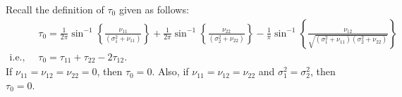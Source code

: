 \documentclass[twoside]{article}
\newcommand{\bZ}{\mathbf{Z}}
\newcommand{\bF}{\mathbf{F}}
\newcommand{\0}{\mathbf{0}}
\newcommand{\1}{\mathbf{1}}
\numberwithin{equation}{section}
\newtheorem{cor}[thm]{Corollary}
\begin{document}
Recall the definition of $\tau_0$ given as follows:
\begin{align*}
 &\ \tau_0 = \frac{1}{2\pi}\sin^{-1}\left \{\frac{\nu_{11}}{(\sigma^2_1 + \nu_{11})}\right\}+ \frac{1}{2\pi}\sin^{-1}\left \{\frac{\nu_{22}}{(\sigma^2_2 + \nu_{22})}\right\}- \frac{1}{\pi}\sin^{-1}\left \{\frac{\nu_{12}}{\sqrt{(\sigma^2_1 + \nu_{11})(\sigma^2_2 + \nu_{22})}}\right\}\\
 \text{i.e., }&\ \tau_0=\tau_{11}+\tau_{22}-2\tau_{12}.
\end{align*}
If $\nu_{11}=\nu_{12}=\nu_{22}=0$, then $\tau_0=0$. Also, if $\nu_{11}=\nu_{12}=\nu_{22}$ and $\sigma^2_1=\sigma^2_2$, then $\tau_0=0$.

\end{document}
